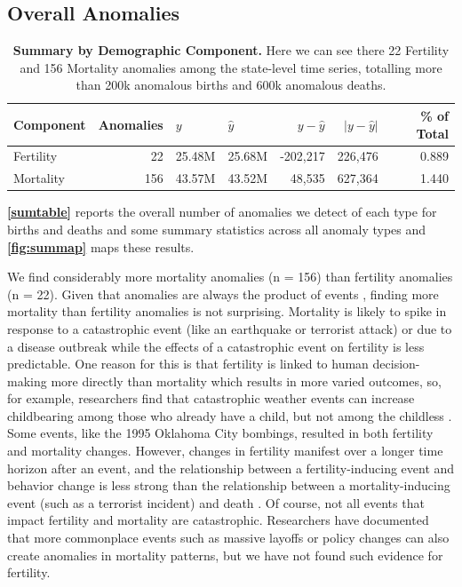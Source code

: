 \documentclass[12pt]{article}
\begin{document}
\hypertarget{overall-anomalies}{%
\subsection{Overall Anomalies}\label{overall-anomalies}}

\begin{table}

\caption{\label{tab:unnamed-chunk-7}\textbf{Summary by Demographic Component.}  Here we can see there 22 Fertility and 156 Mortality anomalies among the state-level time series, totalling more than 200k anomalous births and 600k anomalous deaths. \label{sumtable}}
\centering
\begin{tabular}[t]{lrllrrr}
\toprule
Component & Anomalies & $y$ & $\hat{y}$ & $y-\hat{y}$ & $|y-\hat{y}|$ & \% of Total\\
\midrule
Fertility & 22 & 25.48M & 25.68M & -202,217 & 226,476 & 0.889\\
Mortality & 156 & 43.57M & 43.52M & 48,535 & 627,364 & 1.440\\
\bottomrule
\end{tabular}
\end{table}

\textbf{\autoref{sumtable}} reports the overall number of anomalies we
detect of each type for births and deaths and some summary statistics
across all anomaly types and \textbf{\autoref{fig:summap}} maps these
results.

We find considerably more mortality anomalies (n = 156) than fertility
anomalies (n = 22). Given that anomalies are always the product of
events \citep{song2018anomaly}, finding more mortality than fertility
anomalies is not surprising. Mortality is likely to spike in response to
a catastrophic event (like an earthquake or terrorist attack) or due to
a disease outbreak while the effects of a catastrophic event on
fertility is less predictable. One reason for this is that fertility is
linked to human decision-making more directly than mortality
\citep{stein2014couples} which results in more varied outcomes, so, for
example, researchers find that catastrophic weather events can increase
childbearing among those who already have a child, but not among the
childless \citep{Evans2008Hurricanebirth}. Some events, like the 1995
Oklahoma City bombings, resulted in both fertility and mortality
changes. However, changes in fertility manifest over a longer time
horizon after an event, and the relationship between a
fertility-inducing event and behavior change is less strong than the
relationship between a mortality-inducing event (such as a terrorist
incident) and death \citep{Rodgers2005OKBombing}. Of course, not all
events that impact fertility and mortality are catastrophic. Researchers
have documented that more commonplace events such as massive layoffs
\citep{Venkataramani2019} or policy changes
\citep{Livingston2017Cannabis} can also create anomalies in mortality
patterns, but we have not found such evidence for fertility.
\end{document}
